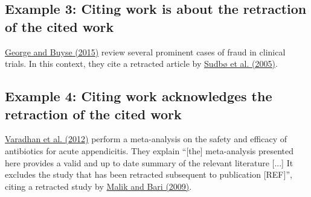 \documentclass[letterpaper, 12pt]{article}
\begin{document}
\subsection*{Example 3: Citing work is about the retraction of the cited work}
\href{https://doi.org/10.4155/cli.14.116}{George and Buyse (2015)} review several prominent cases of fraud in clinical trials. In this context, they cite a retracted article by \href{https://doi.org/10.1016/S0140-6736(05)67488-0}{Sudb\o{} et al. (2005)}.

\subsection*{Example 4: Citing work acknowledges the retraction of the cited work}
\href{https://pmc.ncbi.nlm.nih.gov/articles/PMC3320713/}{Varadhan et al. (2012)} perform a meta-analysis on the safety and efficacy of antibiotics for acute appendicitis. They explain ``[the] meta-analysis presented here provides a valid and up to date summary of the relevant literature [...] It excludes the study that has been retracted subsequent to publication [REF]'', citing a retracted study by \href{https://doi.org/10.1007/s11605-009-0835-5}{Malik and Bari (2009)}. 

\end{document}

